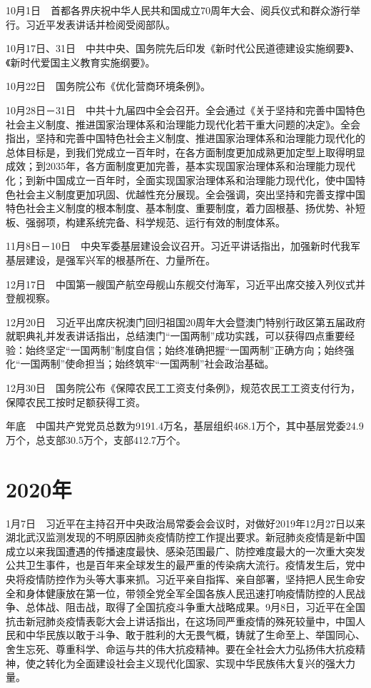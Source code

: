 \documentclass[10pt,a4paper,twocolumn]{book}
\begin{document}
10月1日　首都各界庆祝中华人民共和国成立70周年大会、阅兵仪式和群众游行举行。习近平发表讲话并检阅受阅部队。

10月17日、31日　中共中央、国务院先后印发《新时代公民道德建设实施纲要》、《新时代爱国主义教育实施纲要》。

10月22日　国务院公布《优化营商环境条例》。

10月28日－31日　中共十九届四中全会召开。全会通过《关于坚持和完善中国特色社会主义制度、推进国家治理体系和治理能力现代化若干重大问题的决定》。全会指出，坚持和完善中国特色社会主义制度、推进国家治理体系和治理能力现代化的总体目标是，到我们党成立一百年时，在各方面制度更加成熟更加定型上取得明显成效；到2035年，各方面制度更加完善，基本实现国家治理体系和治理能力现代化；到新中国成立一百年时，全面实现国家治理体系和治理能力现代化，使中国特色社会主义制度更加巩固、优越性充分展现。全会强调，突出坚持和完善支撑中国特色社会主义制度的根本制度、基本制度、重要制度，着力固根基、扬优势、补短板、强弱项，构建系统完备、科学规范、运行有效的制度体系。

11月8日－10日　中央军委基层建设会议召开。习近平讲话指出，加强新时代我军基层建设，是强军兴军的根基所在、力量所在。

12月17日　中国第一艘国产航空母舰山东舰交付海军，习近平出席交接入列仪式并登舰视察。

12月20日　习近平出席庆祝澳门回归祖国20周年大会暨澳门特别行政区第五届政府就职典礼并发表讲话指出，总结澳门“一国两制”成功实践，可以获得四点重要经验：始终坚定“一国两制”制度自信；始终准确把握“一国两制”正确方向；始终强化“一国两制”使命担当；始终筑牢“一国两制”社会政治基础。

12月30日　国务院公布《保障农民工工资支付条例》，规范农民工工资支付行为，保障农民工按时足额获得工资。

年底　中国共产党党员总数为9191.4万名，基层组织468.1万个，其中基层党委24.9万个，总支部30.5万个，支部412.7万个。

\section{2020年}

1月7日　习近平在主持召开中央政治局常委会会议时，对做好2019年12月27日以来湖北武汉监测发现的不明原因肺炎疫情防控工作提出要求。新冠肺炎疫情是新中国成立以来我国遭遇的传播速度最快、感染范围最广、防控难度最大的一次重大突发公共卫生事件，也是百年来全球发生的最严重的传染病大流行。疫情发生后，党中央将疫情防控作为头等大事来抓。习近平亲自指挥、亲自部署，坚持把人民生命安全和身体健康放在第一位，带领全党全军全国各族人民迅速打响疫情防控的人民战争、总体战、阻击战，取得了全国抗疫斗争重大战略成果。9月8日，习近平在全国抗击新冠肺炎疫情表彰大会上讲话指出，在这场同严重疫情的殊死较量中，中国人民和中华民族以敢于斗争、敢于胜利的大无畏气概，铸就了生命至上、举国同心、舍生忘死、尊重科学、命运与共的伟大抗疫精神。要在全社会大力弘扬伟大抗疫精神，使之转化为全面建设社会主义现代化国家、实现中华民族伟大复兴的强大力量。
\end{document}
